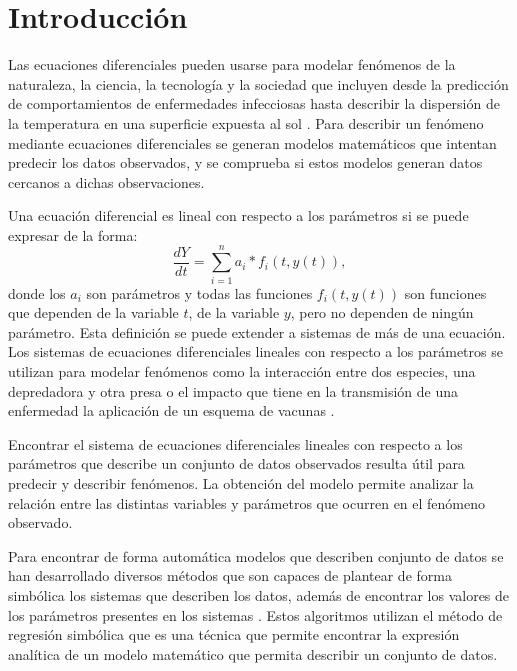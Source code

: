\chapter*{Introducción}\label{chapter:introduction}

\qquad

Las ecuaciones diferenciales pueden usarse para modelar fenómenos de la naturaleza, la ciencia, la tecnología y la sociedad que incluyen desde la predicción de comportamientos de enfermedades infecciosas \cite{weiss2013sir} hasta describir la dispersión de la temperatura en una superficie expuesta al sol \cite{p-transferencia-calor}. Para describir un fenómeno mediante ecuaciones diferenciales se generan modelos matemáticos que intentan predecir los datos observados, y se comprueba si estos modelos generan datos cercanos a dichas observaciones.

Una ecuación diferencial es lineal con respecto a los parámetros si se puede expresar de la forma:
$$\frac{dY}{dt} = \sum_{i=1}^{n} a_i * f_i(t, y(t)),$$
donde los $a_i$ son parámetros y todas las funciones $f_i(t,y(t))$ son funciones que dependen de la variable $t$, de la variable $y$, pero no dependen de ningún parámetro. Esta definición se puede extender a sistemas de más de una ecuación. Los sistemas de ecuaciones diferenciales lineales con respecto a los parámetros se utilizan para modelar fenómenos como la interacción entre dos especies, una depredadora y otra presa \cite{Hoppensteadt:2006} o el impacto que tiene en la transmisión de una enfermedad la aplicación de un esquema de vacunas \cite{kuddus2021mathematical}.

Encontrar el sistema de ecuaciones diferenciales lineales con respecto a los parámetros que describe un conjunto de datos observados resulta útil para predecir y describir fenómenos. La obtención del modelo permite analizar la relación entre las distintas variables y parámetros que ocurren en el fenómeno observado.

Para encontrar de forma automática modelos que describen conjunto de datos se han desarrollado diversos métodos que son capaces de plantear de forma simbólica los sistemas que describen los datos, además de encontrar los valores de los parámetros presentes en los sistemas \cite{gplearn, schmidt2013eureqa}. Estos algoritmos utilizan el método de regresión simbólica que es una técnica que permite encontrar la expresión analítica de un modelo matemático que permita describir un conjunto de datos.

